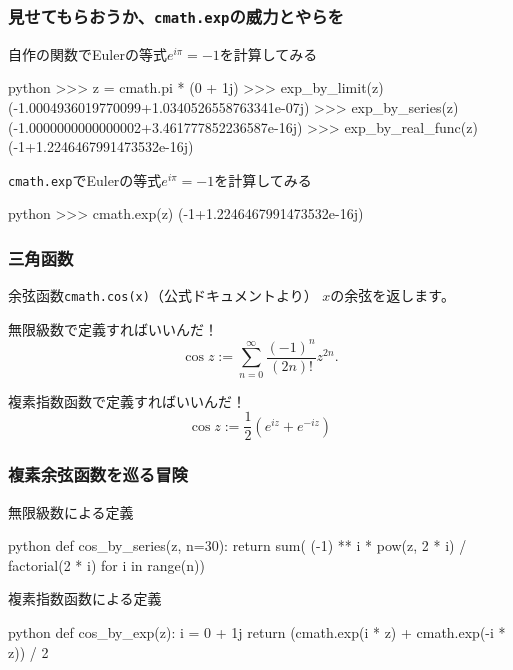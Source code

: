 \documentclass[dvipdfmx,11pt,notheorems]{beamer}
\theoremstyle{definition}
\begin{document}
\begin{frame}[fragile]\frametitle{見せてもらおうか、\texttt{cmath.exp}の威力とやらを}
\begin{exampleblock}{自作の関数でEulerの等式$e^{i\pi} = -1$を計算してみる}
\begin{pygments}{python}
>>> z = cmath.pi * (0 + 1j)
>>> exp_by_limit(z)
(-1.0004936019770099+1.0340526558763341e-07j)
>>> exp_by_series(z)
(-1.0000000000000002+3.461777852236587e-16j)
>>> exp_by_real_func(z)
(-1+1.2246467991473532e-16j)
\end{pygments}
\end{exampleblock}

\begin{exampleblock}{\texttt{cmath.exp}でEulerの等式$e^{i\pi} = -1$を計算してみる}
\begin{pygments}{python}
>>> cmath.exp(z)
(-1+1.2246467991473532e-16j)
\end{pygments}
\end{exampleblock}

\end{frame}

\begin{frame}\frametitle{三角函数}

\begin{block}{余弦函数\texttt{cmath.cos(x)}（公式ドキュメントより）}
$x$の余弦を返します。
\end{block}

\begin{block}{無限級数で定義すればいいんだ！}
\begin{equation*}
\cos{z} := \sum^{\infty}_{n=0}\frac{(-1)^{n}}{(2n)!}z^{2n}.
\end{equation*}
\end{block}

\begin{block}{複素指数函数で定義すればいいんだ！}
\begin{equation*}
\cos{z} := \frac{1}{2}\left(e^{iz} + e^{-iz} \right) 
\end{equation*}
\end{block}

\end{frame}

\begin{frame}[fragile]\frametitle{複素余弦函数を巡る冒険}

\begin{exampleblock}{無限級数による定義}
\begin{pygments}{python}
def cos_by_series(z, n=30):
    return sum(
        (-1) ** i * pow(z, 2 * i) / factorial(2 * i) 
        for i in range(n))
\end{pygments}
\end{exampleblock}

\begin{exampleblock}{複素指数函数による定義}
\begin{pygments}{python}
def cos_by_exp(z):
    i = 0 + 1j
    return (cmath.exp(i * z) + cmath.exp(-i * z)) / 2
\end{pygments}
\end{exampleblock}

\end{frame}
\end{document}
